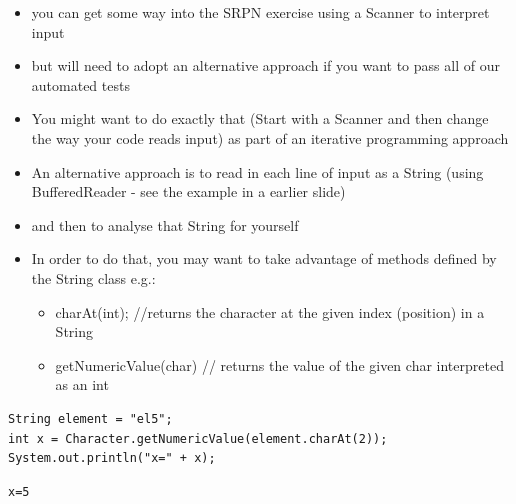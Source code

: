 \documentclass{beamer}
\begin{document}
\begin{frame}
\begin{itemize}
\item you can get some way into the SRPN exercise using a Scanner to interpret input
\item but will need to adopt an alternative approach if you want to pass all of our automated tests
\bigskip
\item You might want to do exactly that (Start with a Scanner and then change the way your code reads input) as part of an iterative programming approach
\end{itemize}
\end{frame}

\begin{frame}
\begin{itemize}
\item An alternative approach is to read in each line of input as a String (using BufferedReader - see the example in a earlier slide)
\item and then to analyse that String for yourself
\end{itemize}
\end{frame}

\begin{frame}[fragile]
\begin{itemize}
\item In order to do that, you may want to take advantage of methods defined by the String class e.g.:
\begin{itemize}
\small
\item charAt(int); //returns the character at the given index (position) in a String
\item getNumericValue(char) // returns the value of the given char interpreted as an int
\end{itemize}
\end{itemize}
\begin{block}{}
\begin{lstlisting}
String element = "el5";
int x = Character.getNumericValue(element.charAt(2));
System.out.println("x=" + x);
\end{lstlisting}
\end{block}
\begin{block}{}
\begin{lstlisting}
x=5
\end{lstlisting}
\end{block}
\end{frame}
\end{document}
